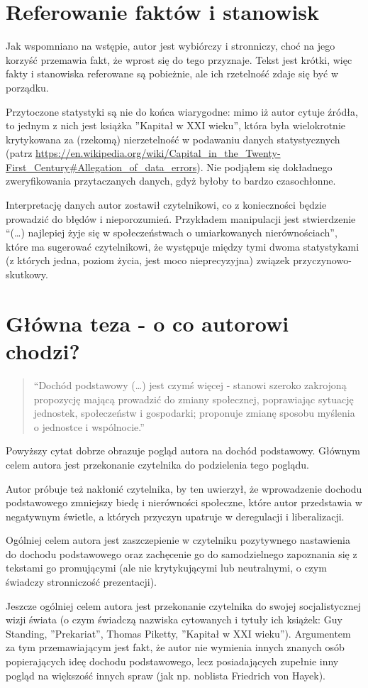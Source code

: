 \documentclass[11pt]{article}
\begin{document}
	\section{Referowanie faktów i stanowisk}
		\par Jak wspomniano na wstępie, autor jest wybiórczy i stronniczy, choć na jego korzyść przemawia fakt, że wprost się do tego przyznaje. Tekst jest krótki, więc fakty i stanowiska referowane są pobieżnie, ale ich rzetelność zdaje się być w porządku.
		\par Przytoczone statystyki są nie do końca wiarygodne: mimo iż autor cytuje źródła, to jednym z nich jest książka ''Kapitał w XXI wieku'', która była wielokrotnie krytykowana za (rzekomą) nierzetelność w podawaniu danych statystycznych (patrz \url{https://en.wikipedia.org/wiki/Capital_in_the_Twenty-First_Century#Allegation_of_data_errors}). Nie podjąłem się dokładnego zweryfikowania przytaczanych danych, gdyż byłoby to bardzo czasochłonne.
		\par Interpretację danych autor zostawił czytelnikowi, co z konieczności będzie prowadzić do błędów i nieporozumień. Przykładem manipulacji jest stwierdzenie ``(\dots) najlepiej żyje się w społeczeństwach o umiarkowanych nierównościach'', które ma sugerować czytelnikowi, że występuje między tymi dwoma statystykami (z których jedna, poziom życia, jest moco nieprecyzyjna) związek przyczynowo-skutkowy.
		
	\section{Główna teza - o co autorowi chodzi?}
		\begin{quote}
			``Dochód podstawowy (\dots) jest czymś więcej - stanowi szeroko zakrojoną propozycję mającą prowadzić do zmiany społecznej, poprawiając sytuację jednostek, społeczeństw i gospodarki; proponuje zmianę sposobu myślenia o jednostce i wspólnocie.''
		\end{quote}
		\par Powyższy cytat dobrze obrazuje pogląd autora na dochód podstawowy. Głównym celem autora jest przekonanie czytelnika do podzielenia tego poglądu.
		\par Autor próbuje też nakłonić czytelnika, by ten uwierzył, że wprowadzenie dochodu podstawowego zmniejszy biedę i nierówności społeczne, które autor przedstawia w negatywnym świetle, a których przyczyn upatruje w deregulacji i liberalizacji.
		\par Ogólniej celem autora jest zaszczepienie w czytelniku pozytywnego nastawienia do dochodu podstawowego oraz zachęcenie go do samodzielnego zapoznania się z tekstami go promującymi (ale nie krytykującymi lub neutralnymi, o czym świadczy stronniczość prezentacji).
		\par Jeszcze ogólniej celem autora jest przekonanie czytelnika do swojej socjalistycznej wizji świata (o czym świadczą nazwiska cytowanych i tytuły ich książek: Guy Standing, ''Prekariat'', Thomas Piketty, ''Kapitał w XXI wieku''). Argumentem za tym przemawiającym jest fakt, że autor nie wymienia innych znanych osób popierających ideę dochodu podstawowego, lecz posiadających zupełnie inny pogląd na większość innych spraw (jak np. noblista Friedrich von Hayek).
	
\end{document}
